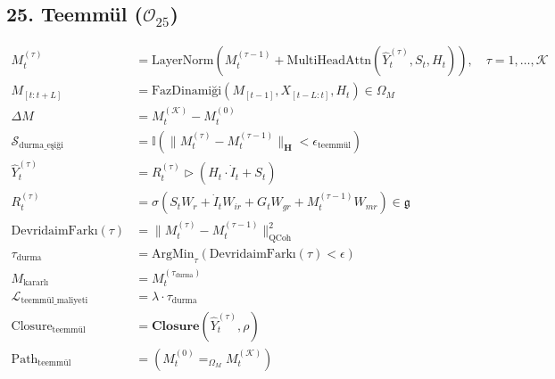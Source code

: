 \documentclass[11pt, a4paper]{article}
\begin{document}
\subsection{25. Teemmül ($\mathcal{O}_{25}$)}
\begin{align}
M_t^{(\tau)} &= \text{LayerNorm}\left( M_t^{(\tau-1)} + \text{MultiHeadAttn}(\hat{Y}_t^{(\tau)}, S_t, H_t) \right), \quad \tau = 1, \dots, \mathcal{K} \\
M_{[t:t+L]} &= \text{FazDinamiği}\left( M_{[t-1]}, X_{[t-L:t]}, H_t \right) \in \Omega_M \\
\Delta M &= M_t^{(\mathcal{K})} - M_t^{(0)} \\
\mathcal{S}_{\text{durma\_eşiği}} &= \mathbb{I}(\|M_t^{(\tau)} - M_t^{(\tau-1)}\|_{\mathbf{H}} < \epsilon_{\text{teemmül}}) \\
\hat{Y}_t^{(\tau)} &= R_t^{(\tau)} \triangleright (H_t \cdot \dot{I}_t + S_t) \\
R_t^{(\tau)} &= \sigma(S_t W_r + \dot{I}_t W_{ir} + G_t W_{gr} + M_t^{(\tau-1)} W_{mr}) \in \mathfrak{g} \\
\text{DevridaimFarkı}(\tau) &= \|M_t^{(\tau)} - M_t^{(\tau-1)}\|_{\text{QCoh}}^2 \\
\tau_{\text{durma}} &= \text{ArgMin}_{\tau} (\text{DevridaimFarkı}(\tau) < \epsilon) \\
M_{\text{kararlı}} &= M_t^{(\tau_{\text{durma}})} \\
\mathcal{L}_{\text{teemmül\_maliyeti}} &= \lambda \cdot \tau_{\text{durma}} \\
\text{Closure}_{\text{teemmül}} &= \mathbf{Closure}(\hat{Y}_t^{(\tau)}, \rho) \\
\text{Path}_{\text{teemmül}} &= (M_t^{(0)} =_{\Omega_M} M_t^{(\mathcal{K})})
\end{align}
\end{document}
